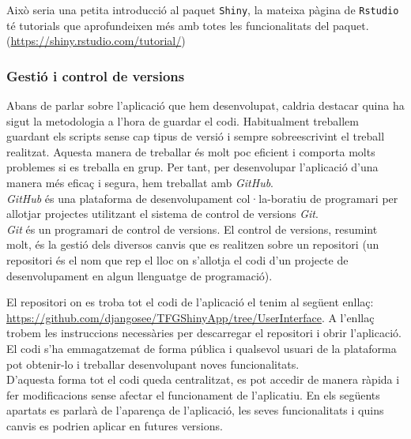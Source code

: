 \documentclass[english]{article}
\begin{document}
Això seria una petita introducció al paquet \texttt{Shiny}, la mateixa pàgina de \texttt{Rstudio} té tutorials que aprofundeixen més amb totes les funcionalitats del paquet. (\url{https://shiny.rstudio.com/tutorial/})

\subsubsection{Gestió i control de versions}
Abans de parlar sobre l'aplicació que hem desenvolupat, caldria destacar quina ha sigut la metodologia a l'hora de guardar el codi. Habitualment treballem guardant els scripts sense cap tipus de versió i sempre sobreescrivint el treball realitzat. Aquesta manera de treballar és molt poc eficient i comporta molts problemes si es treballa en grup. Per tant, per desenvolupar l'aplicació d'una manera més efica\c{c} i segura, hem treballat amb \textit{GitHub}.
\\

\textit{GitHub} és una plataforma de desenvolupament col·la-boratiu de programari per allotjar projectes utilitzant el sistema de control de versions \textit{Git}.
\\

\textit{Git} és un programari de control de versions. El control de versions, resumint molt, és la gestió dels diversos canvis que es realitzen sobre un repositori (un repositori és el nom que rep el lloc on s'allotja el codi d'un projecte de desenvolupament en algun llenguatge de programació).

\newpage
El repositori on es troba tot el codi de l'aplicació el tenim al següent enlla\c{c}: \url{https://github.com/djangosee/TFGShinyApp/tree/UserInterface}.
A l'enlla\c{c} trobem les instruccions necessàries per descarregar el repositori i obrir l'aplicació. El codi s'ha emmagatzemat de forma pública i qualsevol usuari de la plataforma pot obtenir-lo i treballar desenvolupant noves funcionalitats.
\\

D'aquesta forma tot el codi queda centralitzat, es pot accedir de manera ràpida i fer modificacions sense afectar el funcionament de l'aplicatiu. En els següents apartats es parlarà de l'aparen\c{c}a de l'aplicació, les seves funcionalitats i quins canvis es podrien aplicar en futures versions.
\end{document}
